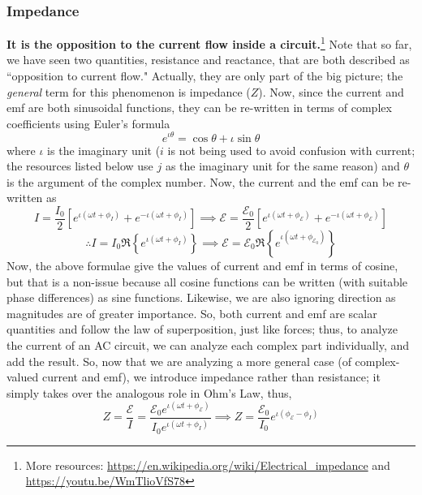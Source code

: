 \documentclass{scrartcl}
\begin{document}
    \subsubsection{Impedance}\newline
    \quad \textbf{It is the opposition to the current flow inside a circuit.}\footnote[5]{More resources: \url{https://en.wikipedia.org/wiki/Electrical_impedance} and\\\url{https://youtu.be/WmTlioVfS78}}
    \newline \quad Note that so far, we have seen two quantities, resistance and reactance, that are both described as ``opposition to current flow." Actually, they are only part of the big picture; the \textit{general} term for this phenomenon is impedance ($Z$).
    \newline \quad Now, since the current and emf are both sinusoidal functions, they can be re-written in terms of complex coefficients using Euler's formula \[\boxed{e^{\iota\theta}=\cos\theta+\iota\sin\theta}\] where $\iota$ is the imaginary unit ($i$ is not being used to avoid confusion with current; the resources listed below use $j$ as the imaginary unit for the same reason) and $\theta$ is the argument of the complex number. Now, the current and the emf can be re-written as \[I=\frac{I_0}2\left[e^{\iota\left(\omega t+\phi_I\right)}+e^{-\iota\left(\omega t+\phi_I\right)}\right]\implies\mathcal E=\frac{\mathcal E_0}2\left[e^{\iota\left(\omega t+\phi_{\mathcal E}\right)}+e^{-\iota\left(\omega t+\phi_{\mathcal E}\right)}\right]\]\[\therefore I=I_0\mathfrak R\left\{e^{\iota\left(\omega t+\phi_I\right)}\right\}\implies\mathcal E=\mathcal E_0\mathfrak R\left\{e^{\iota\left(\omega t+\phi_{\mathcal E_0}\right)}\right\}\] Now, the above formulae give the values of current and emf in terms of cosine, but that is a non-issue because all cosine functions can be written (with suitable phase differences) as sine functions. Likewise, we are also ignoring direction as magnitudes are of greater importance. So, both current and emf are scalar quantities and follow the law of superposition, just like forces; thus, to analyze the current of an AC circuit, we can analyze each complex part individually, and add the result. So, now that we are analyzing a more general case (of complex-valued current and emf), we introduce impedance rather than resistance; it simply takes over the analogous role in Ohm's Law, thus, \[Z=\frac{\mathcal E}I=\frac{\mathcal E_0e^{\iota\left(\omega t+\phi_{\mathcal E}\right)}}{I_0e^{\iota\left(\omega t+\phi_I\right)}}\implies\boxed{Z=\frac{\mathcal E_0}{I_0}e^{\iota\left(\phi_{\mathcal E}-\phi_I\right)}}\]
\end{document}
